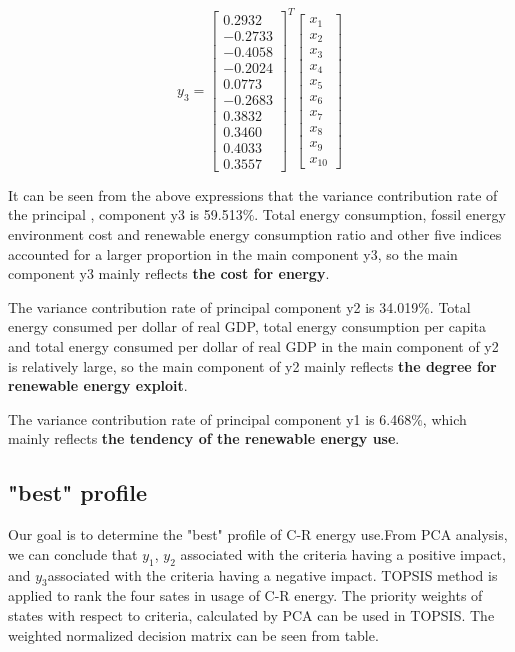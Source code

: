 \documentclass{mcmthesis}
\begin{document}
\begin{enumerate}
\begin{enumerate}
\begin{table}[!hbpt]
          $${ y }_{ 3 }={ \begin{bmatrix} 0.2932 \\ -0.2733 \\ -0.4058 \\ -0.2024 \\ 0.0773 \\ -0.2683 \\0.3832 \\ 0.3460 \\ 0.4033 \\ 0.3557 \end{bmatrix} }^{ T }\begin{bmatrix} x_{ 1 } \\ x_{ 2 } \\ x_{ 3 } \\ x_{ 4 } \\ x_{ 5 } \\ x_{ 6 } \\ x_{ 7 } \\ x_{ 8 } \\ x_{ 9 } \\ x_{ 10 } \end{bmatrix}$$
             \end{table}
            It can be seen from the above expressions that the variance contribution rate of the principal , component y3 is 59.513$\%$. Total energy consumption, fossil energy environment cost and renewable energy consumption ratio and other five indices accounted for a larger proportion in the main component y3, so the main component y3 mainly reflects \textbf{the cost for energy}.

            The variance contribution rate of principal component y2 is 34.019$\%$.  Total energy consumed per dollar of real GDP, total energy consumption per capita and total energy consumed per dollar of real GDP in the main component of y2 is relatively large, so the main component of y2 mainly reflects \textbf{the degree for renewable energy exploit}.

            The variance contribution rate of principal component y1 is 6.468$\%$, which mainly reflects \textbf{the tendency of the renewable energy use}.
        \end{enumerate}

\subsection{"best" profile}

       Our goal is to determine the "best" profile of C-R energy use.From PCA analysis, we can conclude that $y_{1}$, $y_{2}$ associated with the criteria having a positive impact, and $y_{3}$associated with the criteria having a negative  impact.
      TOPSIS method is applied to rank the four sates in usage of C-R energy. The priority weights of states with respect to criteria, calculated by PCA can be used in TOPSIS. The weighted normalized decision matrix can be seen from table.


\end{enumerate}
\end{document}
